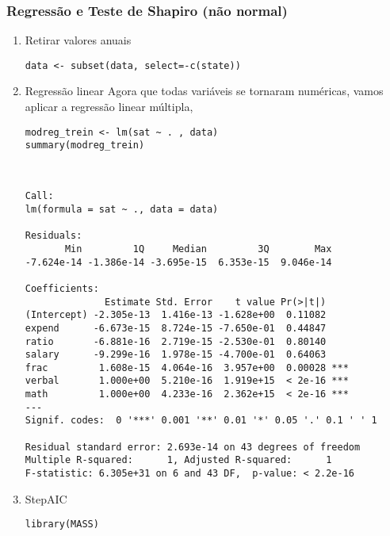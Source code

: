 \documentclass[11pt]{article}
\begin{document}
\subsubsection{Regressão e Teste de Shapiro (não normal)}
\label{sec:orgf33c7cc}
\begin{enumerate}
\item Retirar valores anuais
\label{sec:org56a0b5a}
\begin{verbatim}
data <- subset(data, select=-c(state))
\end{verbatim}

\item Regressão linear
\label{sec:orgd1584ea}
Agora que todas variáveis se tornaram numéricas, vamos aplicar a regressão linear múltipla,

\begin{verbatim}
modreg_trein <- lm(sat ~ . , data)
summary(modreg_trein)
\end{verbatim}

\begin{verbatim}


Call:
lm(formula = sat ~ ., data = data)

Residuals:
       Min         1Q     Median         3Q        Max 
-7.624e-14 -1.386e-14 -3.695e-15  6.353e-15  9.046e-14 

Coefficients:
              Estimate Std. Error    t value Pr(>|t|)    
(Intercept) -2.305e-13  1.416e-13 -1.628e+00  0.11082    
expend      -6.673e-15  8.724e-15 -7.650e-01  0.44847    
ratio       -6.881e-16  2.719e-15 -2.530e-01  0.80140    
salary      -9.299e-16  1.978e-15 -4.700e-01  0.64063    
frac         1.608e-15  4.064e-16  3.957e+00  0.00028 ***
verbal       1.000e+00  5.210e-16  1.919e+15  < 2e-16 ***
math         1.000e+00  4.233e-16  2.362e+15  < 2e-16 ***
---
Signif. codes:  0 '***' 0.001 '**' 0.01 '*' 0.05 '.' 0.1 ' ' 1

Residual standard error: 2.693e-14 on 43 degrees of freedom
Multiple R-squared:      1,	Adjusted R-squared:      1 
F-statistic: 6.305e+31 on 6 and 43 DF,  p-value: < 2.2e-16

\end{verbatim}

\item StepAIC
\label{sec:orge87e8b3}
\begin{verbatim}
library(MASS)
\end{verbatim}


\end{enumerate}
\end{document}

